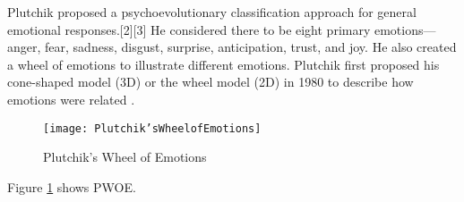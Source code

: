 Plutchik proposed a psychoevolutionary classification approach for general emotional responses.[2][3] He considered there to be eight primary emotions—anger, fear, sadness, disgust, surprise, anticipation, trust, and joy.
He also created a wheel of emotions to illustrate different emotions. Plutchik first proposed his cone-shaped model (3D) or the wheel model (2D) in 1980 to describe how emotions were related \cite{enwiki:1136521972}.
\begin{figure}[H]
	\texttt{[image: Plutchik'sWheelofEmotions]}
	\caption{Plutchik's Wheel of Emotions}
	\label{Fig:fig}
\end{figure}
Figure \ref{Fig:fig} shows PWOE.